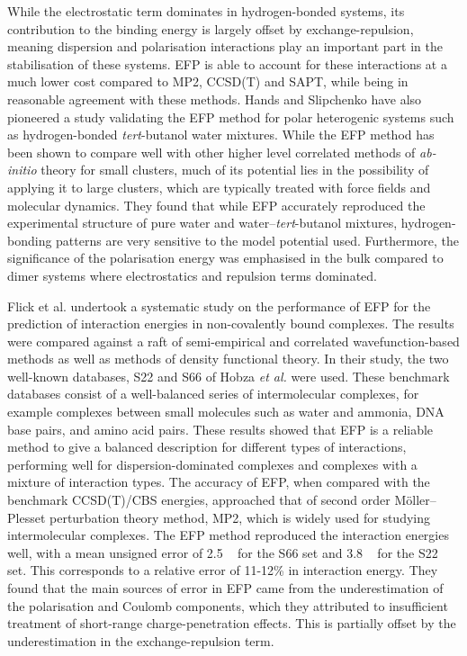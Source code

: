 While the electrostatic term dominates in hydrogen-bonded systems, its contribution to the binding energy is largely offset by exchange-repulsion, meaning dispersion and polarisation interactions play an important part in the stabilisation of these systems.
EFP is able to account for these interactions at a much lower cost compared to MP2, CCSD(T) and SAPT, while being in reasonable agreement with these methods.
\cite{Smith2011b}
Hands and Slipchenko have also pioneered a study validating the EFP method for polar heterogenic systems
\cite{Hands2012a}
such as hydrogen-bonded \emph{tert}-butanol water mixtures.
While the EFP method has been shown to compare well with other higher level correlated methods of \emph{ab-initio} theory for small clusters, much of its potential lies in the possibility of applying it to large clusters, which are typically treated with force fields and molecular dynamics.
They found that while EFP accurately reproduced the experimental structure of pure water and water--\emph{tert}-butanol mixtures, hydrogen-bonding patterns are very sensitive to the model potential used.
Furthermore, the significance of the polarisation energy was emphasised in the bulk compared to dimer systems where electrostatics and repulsion terms dominated.


Flick et al. undertook a systematic study on the performance of EFP for the prediction of interaction energies in non-covalently bound complexes.
\cite{Flick2012a}
The results were compared against a raft of semi-empirical and correlated wavefunction-based methods as well as methods of density functional theory.
In their study, the two well-known databases, S22 and S66 of Hobza \emph{et al.}
\cite{Jurecka2006a, Rezac2011a}    
were used.
These benchmark databases consist of a well-balanced series of intermolecular complexes, for example complexes between small molecules such as water and ammonia, DNA base pairs, and amino acid pairs. 
These results showed that EFP is a reliable method to give a balanced description for different types of interactions, performing well for dispersion-dominated complexes and complexes with a mixture of interaction types.
The accuracy of EFP, when compared with the benchmark CCSD(T)/CBS energies, approached that of second order M\"{o}ller--Plesset perturbation theory method, MP2, which is widely used for studying intermolecular complexes. 
The EFP method reproduced the interaction energies well, with a mean unsigned error of 2.5 \enUnit~ for the S66 set and 3.8 \enUnit~ for the S22 set.
This corresponds to a relative error of 11-12\% in interaction energy. 
They found that the main sources of error in EFP came from the underestimation of the polarisation and Coulomb components, which they attributed to insufficient treatment of short-range charge-penetration effects. 
This is partially offset by the underestimation in the exchange-repulsion term.


